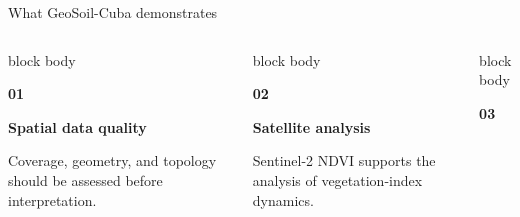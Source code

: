 \documentclass[aspectratio=169,10pt]{beamer}
\begin{document}
	
	\begin{frame}{What GeoSoil-Cuba demonstrates}
		
		\begin{columns}[T,onlytextwidth]
			
			
			\begin{beamercolorbox}[
				rounded=true,
				sep=0.22cm,
				wd=\linewidth
				]{block body}
				
				{\color{leaf}\Large\bfseries 01}
				
				\vspace{0.15cm}
				
				{\large\bfseries
					Spatial data quality}
				
				\vspace{0.15cm}
				
				\small
				Coverage, geometry, and topology
				should be assessed before interpretation.
				
			\end{beamercolorbox}
			
			
			\begin{beamercolorbox}[
				rounded=true,
				sep=0.22cm,
				wd=\linewidth
				]{block body}
				
				{\color{leaf}\Large\bfseries 02}
				
				\vspace{0.15cm}
				
				{\large\bfseries
					Satellite analysis}
				
				\vspace{0.15cm}
				
				\small
				Sentinel-2 NDVI supports the
				analysis of vegetation-index dynamics.
				
			\end{beamercolorbox}
			
			
			\begin{beamercolorbox}[
				rounded=true,
				sep=0.22cm,
				wd=\linewidth
				]{block body}
				
				{\color{leaf}\Large\bfseries 03}
				
				\vspace{0.15cm}
				

\end{beamercolorbox}
\end{columns}
\end{frame}
\end{document}
